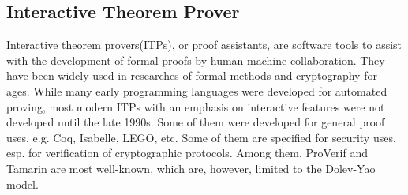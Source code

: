 \documentclass[conference]{IEEEtran}
\begin{document}
\subsection{Interactive Theorem Prover}
Interactive theorem provers(ITPs), or proof assistants, are software tools to assist with the development of formal proofs by human-machine collaboration. They have been widely used in researches of formal methods and cryptography for ages. While many early programming languages were developed for automated proving, most modern ITPs with an emphasis on interactive features were not developed until the late 1990s.\cite{SOK/PA} Some of them were developed for general proof uses, e.g. Coq\cite{Coq}, Isabelle\cite{Isabelle}, LEGO\cite{LEGO}, etc. Some of them are specified for security uses, esp. for verification of cryptographic protocols. Among them, ProVerif\cite{ProVerif} and Tamarin\cite{Tamarin} are most well-known, which are, however, limited to the Dolev-Yao model.
\end{document}

